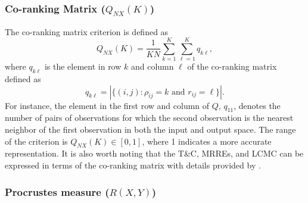 \documentclass[11pt,a4paper,]{article}
\begin{document}
\hypertarget{co-ranking-matrix-q_nxk}{%
\subsubsection*{\texorpdfstring{Co-ranking Matrix (\(Q_{NX}(K)\))}{Co-ranking Matrix (Q\_\{NX\}(K))}}\label{co-ranking-matrix-q_nxk}}

The co-ranking matrix criterion is defined as
\begin{equation}\label{eq:Q_NX}
  Q_{NX}(K)=\frac{1}{K N} \sum_{k=1}^{K} \sum_{\ell=1}^{K} q_{k\ell},
\end{equation}
where \(q_{k\ell}\) is the element in row \(k\) and column \(\ell\) of the co-ranking matrix defined as
\begin{equation}\label{eq:coRanking}
  q_{k\ell}=|\{(i, j): \rho_{i j}=k \text { and } r_{i j}=\ell\}|.
\end{equation}
For instance, the element in the first row and column of \(Q\), \(q_{11}\), denotes the number of pairs of observations for which the second observation is the nearest neighbor of the first observation in both the input and output space. The range of the criterion is \(Q_{N X}(K) \in[0,1]\), where 1 indicates a more accurate representation. It is also worth noting that the T\&C, MRREs, and LCMC can be expressed in terms of the co-ranking matrix with details provided by \textcite{Lee2008-dy}.

\hypertarget{procrustes-measure-rxy}{%
\subsubsection*{\texorpdfstring{Procrustes measure (\(R(X,Y)\))}{Procrustes measure (R(X,Y))}}\label{procrustes-measure-rxy}}
\end{document}
